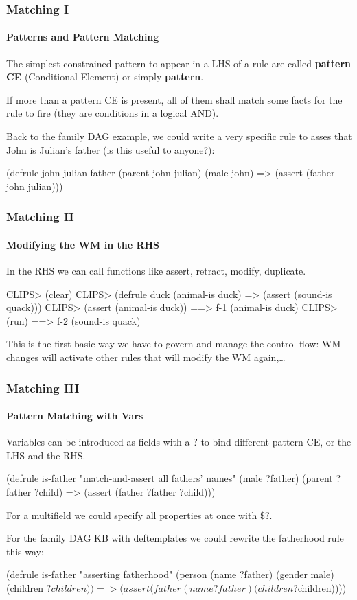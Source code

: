 \documentclass[xcolor={usenames,dvipsnames,svgnames}, compress]{beamer}
\begin{document}
\begin{frame}[fragile]
  \frametitle{Matching I}
  \framesubtitle{Patterns and Pattern Matching}
  The simplest constrained pattern to appear in a LHS of a rule are called \textbf{pattern
    CE} (Conditional Element) or simply \textbf{pattern}.\par\bigskip

  If more than a pattern CE is present, all of them shall match some
  facts for the rule to fire (they are conditions in a logical AND).\par\bigskip

  Back to the family DAG example, we could write a very specific rule
  to asses that John is Julian's father (is this useful to anyone?):
  \begin{clips-code}[numbers=none]
    (defrule john-julian-father
        (parent john julian)
        (male john)
        =>
        (assert (father john julian)))
  \end{clips-code}
\end{frame}

\begin{frame}[fragile]
  \frametitle{Matching II}
  \framesubtitle{Modifying the WM in the RHS}
  In the RHS we can call functions like \textsf{assert}, \textsf{retract}, \textsf{modify}, \textsf{duplicate}.
  \begin{clips-code}
    CLIPS> (clear)
    CLIPS> (defrule duck
               (animal-is duck)
               =>
               (assert (sound-is quack)))
    CLIPS> (assert (animal-is duck))
    ==> f-1 (animal-is duck)
    CLIPS> (run)
    ==> f-2 (sound-is quack)
  \end{clips-code}
  This is the first basic way we have to govern and manage the control
  flow: WM changes will activate other rules that will modify the WM again,\dots
\end{frame}

\begin{frame}[fragile]
  \frametitle{Matching III}
  \framesubtitle{Pattern Matching with Vars}
  Variables can be introduced as fields with a $?$ to bind different pattern CE,
  or the LHS and the RHS.
  \begin{clips-code}[numbers=none]
    (defrule is-father
        "match-and-assert all fathers' names"
        (male ?father)
        (parent ?father ?child)
        =>
        (assert (father ?father ?child)))
  \end{clips-code}
  
  For a multifield we could specify all properties at once with
  $\$?$.\par
  For the family DAG KB with deftemplates we could rewrite the
  fatherhood rule this way:
  \begin{clips-code}[numbers=none]
    (defrule is-father
        "asserting fatherhood"
        (person (name ?father) (gender male) (children $?children))
        =>
        (assert (father (name ?father) (children $?children))))
  \end{clips-code}
\end{frame}
\end{document}
